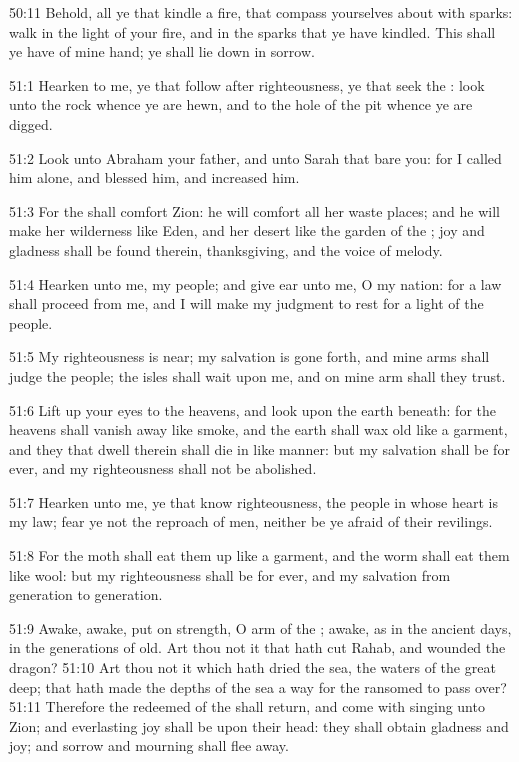50:11 Behold, all ye that kindle a fire, that compass yourselves about
with sparks: walk in the light of your fire, and in the sparks that ye
have kindled. This shall ye have of mine hand; ye shall lie down in
sorrow.

51:1 Hearken to me, ye that follow after righteousness, ye that seek
the \LORD: look unto the rock whence ye are hewn, and to the hole of
the pit whence ye are digged.

51:2 Look unto Abraham your father, and unto Sarah that bare you: for
I called him alone, and blessed him, and increased him.

51:3 For the \LORD shall comfort Zion: he will comfort all her waste
places; and he will make her wilderness like Eden, and her desert like
the garden of the \LORD; joy and gladness shall be found therein,
thanksgiving, and the voice of melody.

51:4 Hearken unto me, my people; and give ear unto me, O my nation:
for a law shall proceed from me, and I will make my judgment to rest
for a light of the people.

51:5 My righteousness is near; my salvation is gone forth, and mine
arms shall judge the people; the isles shall wait upon me, and on mine
arm shall they trust.

51:6 Lift up your eyes to the heavens, and look upon the earth
beneath: for the heavens shall vanish away like smoke, and the earth
shall wax old like a garment, and they that dwell therein shall die in
like manner: but my salvation shall be for ever, and my righteousness
shall not be abolished.

51:7 Hearken unto me, ye that know righteousness, the people in whose
heart is my law; fear ye not the reproach of men, neither be ye afraid
of their revilings.

51:8 For the moth shall eat them up like a garment, and the worm shall
eat them like wool: but my righteousness shall be for ever, and my
salvation from generation to generation.

51:9 Awake, awake, put on strength, O arm of the \LORD; awake, as in
the ancient days, in the generations of old. Art thou not it that hath
cut Rahab, and wounded the dragon?  51:10 Art thou not it which hath
dried the sea, the waters of the great deep; that hath made the depths
of the sea a way for the ransomed to pass over?  51:11 Therefore the
redeemed of the \LORD shall return, and come with singing unto Zion;
and everlasting joy shall be upon their head: they shall obtain
gladness and joy; and sorrow and mourning shall flee away.

